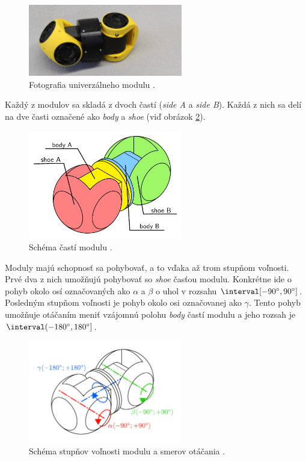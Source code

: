 \documentclass[
  digital, %
  twoside, %
  table,   %
  nolof,     %
  nolot,     %
]{fithesis3}
\begin{document}
\begin{figure}[hbt!]
    \centering
    \includegraphics[width=0.6\textwidth]{pictures/module.jpg}
    \caption[Fotografia modulu]{Fotografia univerzálneho modulu \cite{rofiWeb}.}
    \label{fig:module}
\end{figure}

Každý z modulov sa skladá z dvoch častí (\textit{side A} a \textit{side B}). Každá z nich sa delí na dve časti označené ako \textit{body} a \textit{shoe} (viď obrázok \ref{fig:module_parts}). 

\begin{figure}[hbt!]
    \centering
    \includegraphics[width=0.6\textwidth]{pictures/module_parts.pdf}
    \caption[Časti modulu]{Schéma častí modulu \cite{mrazekMasterThesis}.}
    \label{fig:module_parts}
\end{figure}

Moduly majú schopnosť sa pohybovať, a to vďaka až trom stupňom voľnosti. Prvé dva z nich umožňujú pohybovať so \textit{shoe} časťou modulu. Konkrétne ide o pohyb okolo osí označovaných ako $\alpha$ a $\beta$  o uhol v rozsahu $\interval[{-90\degree, 90\degree}]$. Posledným stupňom voľnosti je pohyb okolo osi označovanej ako $\gamma$. Tento pohyb umožňuje otáčaním meniť vzájomnú polohu \textit{body} častí modulu a jeho rozsah je $\interval({-180\degree, 180\degree}]$. 

\begin{figure}[hbt!]
    \centering
    \includegraphics[width=0.6\textwidth]{pictures/module_angles.pdf}
    \caption[Stupne voľnosti modulu]{Schéma stupňov voľnosti modulu a smerov otáčania \cite{mrazekMasterThesis}.}
    \label{fig:module_angle}
\end{figure}
\end{document}

